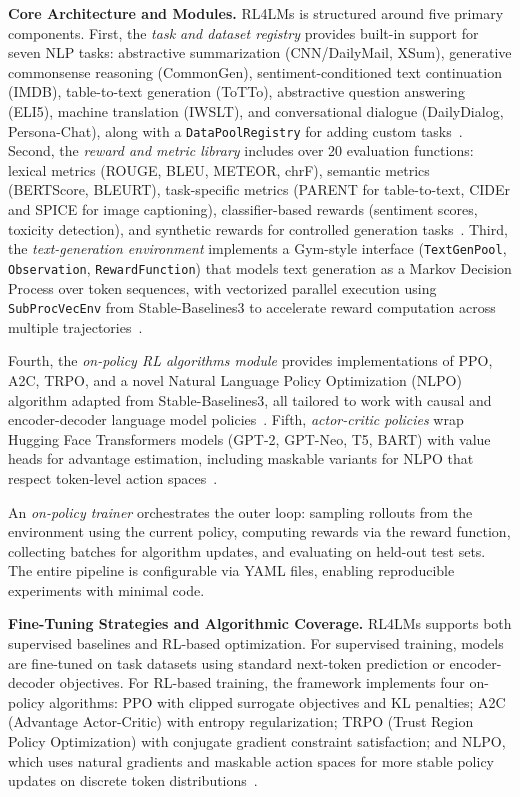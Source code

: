 \documentclass[conference]{IEEEtran}
\begin{document}
\textbf{Core Architecture and Modules.} RL4LMs is structured around five primary components. First, the \textit{task and dataset registry} provides built-in support for seven NLP tasks: abstractive summarization (CNN/DailyMail, XSum), generative commonsense reasoning (CommonGen), sentiment-conditioned text continuation (IMDB), table-to-text generation (ToTTo), abstractive question answering (ELI5), machine translation (IWSLT), and conversational dialogue (DailyDialog, Persona-Chat), along with a \texttt{DataPoolRegistry} for adding custom tasks~\cite{rl4lms-github}. Second, the \textit{reward and metric library} includes over 20 evaluation functions: lexical metrics (ROUGE, BLEU, METEOR, chrF), semantic metrics (BERTScore, BLEURT), task-specific metrics (PARENT for table-to-text, CIDEr and SPICE for image captioning), classifier-based rewards (sentiment scores, toxicity detection), and synthetic rewards for controlled generation tasks~\cite{rl4lms-github}. Third, the \textit{text-generation environment} implements a Gym-style interface (\texttt{TextGenPool}, \texttt{Observation}, \texttt{RewardFunction}) that models text generation as a Markov Decision Process over token sequences, with vectorized parallel execution using \texttt{SubProcVecEnv} from Stable-Baselines3 to accelerate reward computation across multiple trajectories~\cite{rl4lms-github}.

Fourth, the \textit{on-policy RL algorithms module} provides implementations of PPO, A2C, TRPO, and a novel Natural Language Policy Optimization (NLPO) algorithm adapted from Stable-Baselines3, all tailored to work with causal and encoder-decoder language model policies~\cite{rl4lms-paper}. Fifth, \textit{actor-critic policies} wrap Hugging Face Transformers models (GPT-2, GPT-Neo, T5, BART) with value heads for advantage estimation, including maskable variants for NLPO that respect token-level action spaces~\cite{rl4lms-github}.

An \textit{on-policy trainer} orchestrates the outer loop: sampling rollouts from the environment using the current policy, computing rewards via the reward function, collecting batches for algorithm updates, and evaluating on held-out test sets. The entire pipeline is configurable via YAML files, enabling reproducible experiments with minimal code.

\textbf{Fine-Tuning Strategies and Algorithmic Coverage.} RL4LMs supports both supervised baselines and RL-based optimization. For supervised training, models are fine-tuned on task datasets using standard next-token prediction or encoder-decoder objectives. For RL-based training, the framework implements four on-policy algorithms: PPO with clipped surrogate objectives and KL penalties; A2C (Advantage Actor-Critic) with entropy regularization; TRPO (Trust Region Policy Optimization) with conjugate gradient constraint satisfaction; and NLPO, which uses natural gradients and maskable action spaces for more stable policy updates on discrete token distributions~\cite{rl4lms-paper}.
\end{document}
